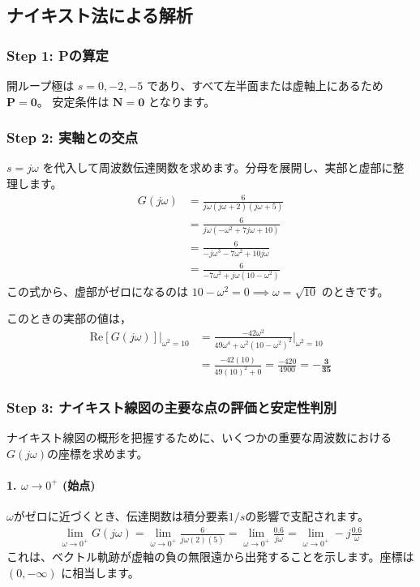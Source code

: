 \documentclass[11pt,a4paper]{ltjsarticle}
\begin{document}
\subsection{ナイキスト法による解析}
\subsubsection{Step 1: Pの算定}
開ループ極は $s=0, -2, -5$ であり、すべて左半面または虚軸上にあるため $\bm{P=0}$。
安定条件は $\bm{N=0}$ となります。

\subsubsection{Step 2: 実軸との交点}
$s=j\omega$ を代入して周波数伝達関数を求めます。分母を展開し、実部と虚部に整理します。
\begin{align*}
G(j\omega) &= \frac{6}{j\omega(j\omega+2)(j\omega+5)} \\
&= \frac{6}{j\omega(-\omega^2 + 7j\omega + 10)} \\
&= \frac{6}{-j\omega^3 - 7\omega^2 + 10j\omega} \\
&= \frac{6}{-7\omega^2 + j\omega(10 - \omega^2)}
\end{align*}
この式から、虚部がゼロになるのは $10-\omega^2=0 \implies \omega = \sqrt{10}$ のときです。

このときの実部の値は，
\begin{align*}
\text{Re}[G(j\omega)]|_{\omega^2=10} &= \frac{-42\omega^2}{49\omega^4 + \omega^2(10-\omega^2)^2} |_{\omega^2=10} \\
&= \frac{-42(10)}{49(10)^2 + 0} = \frac{-420}{4900} = \bm{-\frac{3}{35}}
\end{align*}

\subsubsection{Step 3: ナイキスト線図の主要な点の評価と安定性判別}
ナイキスト線図の概形を把握するために、いくつかの重要な周波数における$G(j\omega)$の座標を求めます。

\paragraph{1. $\omega \to 0^+$ (始点)}
$\omega$がゼロに近づくとき、伝達関数は積分要素$1/s$の影響で支配されます。
\begin{align*}
    \lim_{\omega \to 0^+} G(j\omega) = \lim_{\omega \to 0^+} \frac{6}{j\omega(2)(5)} = \lim_{\omega \to 0^+} \frac{0.6}{j\omega} = \lim_{\omega \to 0^+} -j\frac{0.6}{\omega}
\end{align*}
これは、ベクトル軌跡が虚軸の負の無限遠から出発することを示します。座標は $\left(0, -\infty\right)$ に相当します。
\end{document}
